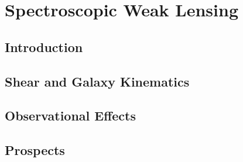 \chapter{Spectroscopic Weak Lensing}

\label{chap:speclens}

  
 

\section{Introduction}


\section{Shear and Galaxy Kinematics}
\label{speclens_s:theory}

\section{Observational Effects}

\section{Prospects}
